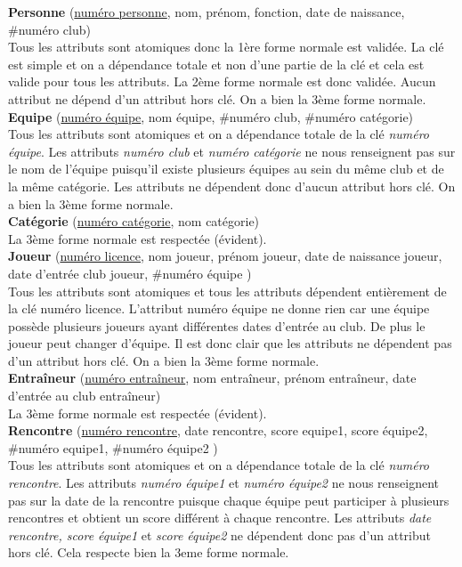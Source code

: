 \documentclass{article}
\begin{document}
\textbf{Personne} (\underline{numéro personne}, nom, prénom, fonction, date de naissance, \#numéro club) \\
Tous les attributs sont atomiques donc la 1ère forme normale est validée. La clé est simple et on a dépendance totale et non d'une partie de la clé et cela est valide pour tous les attributs. La 2ème forme normale est donc validée.  Aucun attribut ne dépend d'un attribut hors clé. On a bien la 3ème forme normale. \\

\textbf{Equipe} (\underline{numéro équipe}, nom équipe, \#numéro club, \#numéro catégorie) \\
Tous les attributs sont atomiques et on a dépendance totale de la clé \emph{numéro équipe}. Les attributs \emph{numéro club} et \emph{numéro catégorie} ne nous renseignent pas sur le nom de l'équipe puisqu'il existe plusieurs équipes au sein du même club et de la même catégorie. Les attributs ne dépendent donc d'aucun attribut hors clé. On a bien la 3ème forme normale. \\

\textbf{Catégorie} (\underline{numéro catégorie}, nom catégorie)\\
La 3ème forme normale est respectée (évident). \\

\textbf{Joueur} (\underline{numéro licence}, nom joueur, prénom joueur, date de naissance joueur, date d'entrée club joueur, \#numéro équipe ) \\
Tous les attributs sont atomiques et tous les attributs dépendent entièrement de la clé numéro licence. L'attribut numéro équipe ne donne rien car une équipe possède plusieurs joueurs ayant différentes dates d'entrée au club. De plus le joueur peut changer d'équipe. Il est donc clair que les attributs ne dépendent pas d'un attribut hors clé. On a bien la 3ème forme normale. \\

\textbf{Entraîneur} (\underline{numéro entraîneur}, nom entraîneur, prénom entraîneur, date d'entrée au club entraîneur) \\
La 3ème forme normale est respectée (évident). \\

\textbf{Rencontre} (\underline{numéro rencontre}, date rencontre, score equipe1, score équipe2, \#numéro equipe1, \#numéro équipe2 ) \\
Tous les attributs sont atomiques et on a dépendance totale de la clé \emph{numéro rencontre}. Les attributs \emph{numéro équipe1} et \emph{numéro équipe2} ne nous renseignent pas sur la date de la rencontre puisque chaque équipe peut participer à plusieurs rencontres et obtient un score différent à chaque rencontre. Les attributs \emph{date rencontre, score équipe1} et \emph{score équipe2} ne dépendent donc pas d'un attribut hors clé. Cela respecte bien la 3eme forme normale. \\
\end{document}
